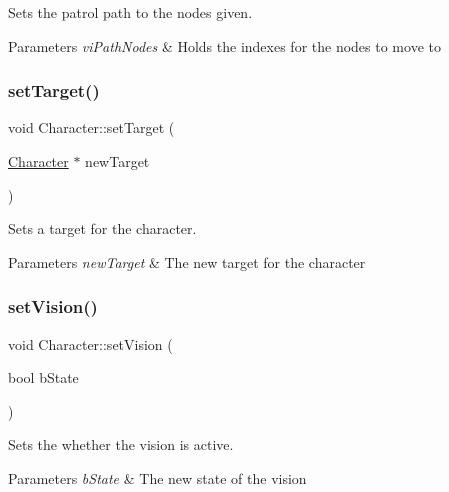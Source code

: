 Sets the patrol path to the nodes given. 


\begin{DoxyParams}{Parameters}
{\em vi\+Path\+Nodes} & Holds the indexes for the nodes to move to \\
\hline
\end{DoxyParams}
\mbox{\label{class_character_a7a318c427231b03423bd65af5f257776}} 
\subsubsection{\texorpdfstring{set\+Target()}{setTarget()}}
{\footnotesize\ttfamily void Character\+::set\+Target (\begin{DoxyParamCaption}\item[{\hyperlink{class_character}{Character} $\ast$}]{new\+Target }\end{DoxyParamCaption})}



Sets a target for the character. 


\begin{DoxyParams}{Parameters}
{\em new\+Target} & The new target for the character \\
\hline
\end{DoxyParams}
\mbox{\label{class_character_a360fa750198888b54a96f0c811de1893}} 
\subsubsection{\texorpdfstring{set\+Vision()}{setVision()}}
{\footnotesize\ttfamily void Character\+::set\+Vision (\begin{DoxyParamCaption}\item[{bool}]{b\+State }\end{DoxyParamCaption})}



Sets the whether the vision is active. 


\begin{DoxyParams}{Parameters}
{\em b\+State} & The new state of the vision \\
\hline
\end{DoxyParams}
\mbox{\label{class_character_a1e7a69d8500b81ad27e51923ec1b335b}} 
